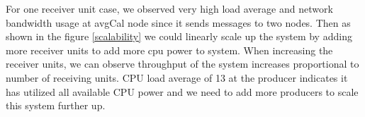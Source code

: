 For one receiver unit case, we observed very high load average and network bandwidth usage at avgCal node since it sends messages to two nodes. Then as shown in the figure \ref{scalability} we could linearly scale up the system by adding more receiver units to add more cpu power to system. When increasing the receiver units, we can observe throughput of the system increases proportional to number of receiving units. CPU load average of 13 at the producer indicates it has utilized all available CPU power and we need to add more producers to scale this system further up. 


